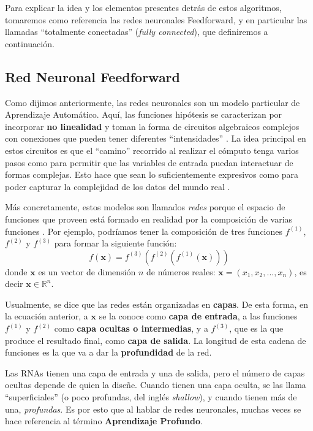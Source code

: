 \documentclass[../../main.tex]{subfiles}
\begin{document}
Para explicar la idea y los elementos presentes detrás de estos algoritmos, tomaremos como
referencia las redes neuronales Feedforward, y en particular las llamadas ``totalmente
conectadas'' (\textit{fully connected}), que definiremos a continuación.

\subsection{Red Neuronal Feedforward}
Como dijimos anteriormente, las redes neuronales son un modelo particular de Aprendizaje
Automático. Aquí, las funciones hipótesis se caracterizan por incorporar \textbf{no
linealidad} y toman la forma de circuitos algebraicos complejos con conexiones que pueden
tener diferentes ``intensidades'' \cite{ai-a-modern-approach}. La idea principal en estos
circuitos es que el ``camino'' recorrido al realizar el cómputo tenga varios pasos como
para permitir que las variables de entrada puedan interactuar de formas complejas. Esto
hace que sean lo suficientemente expresivos como para poder capturar la complejidad de los
datos del mundo real \cite{ai-a-modern-approach}.

Más concretamente, estos modelos son llamados \textit{redes} porque el espacio de
funciones que proveen está formado en realidad por la composición de varias funciones
\cite{deep-learning}. Por ejemplo, podríamos tener la composición de tres funciones
\(f^{(1)}\), \(f^{(2)}\) y \(f^{(3)}\) para formar la siguiente función:
\begin{equation}
    f(\bm{x}) = f^{(3)}(f^{(2)}(f^{(1)}(\bm{x})))
    \label{eq:fun-composition}
\end{equation}
donde \(\bm{x}\) es un vector de dimensión \(n\) de números reales: \(\bm{x}=(x_1,
x_2, ..., x_n)\), es decir \(\bm{x} \in \mathbb{R}^n\).

Usualmente, se dice que las redes están organizadas en \textbf{capas}. De esta forma, en
la ecuación anterior, a \(\bm{x}\) se la conoce como \textbf{capa de entrada}, a las
funciones \(f^{(1)}\) y \(f^{(2)}\) como \textbf{capa ocultas o intermedias}, y a
\(f^{(3)}\), que es la que produce el resultado final, como \textbf{capa de salida}. La
longitud de esta cadena de funciones es la que va a dar la \textbf{profundidad} de la red.

Las RNAs tienen una capa de entrada y una de salida, pero el número de capas ocultas
depende de quien la diseñe. Cuando tienen una capa oculta, se las llama ``superficiales''
(o poco profundas, del inglés \textit{shallow}), y cuando tienen más de una,
\textit{profundas}. Es por esto que al hablar de redes neuronales, muchas veces se
hace referencia al término \textbf{Aprendizaje Profundo}.
\end{document}
